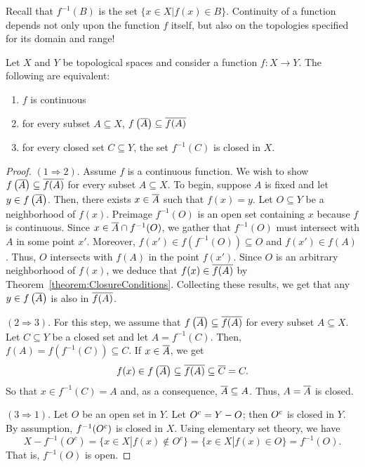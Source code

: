 Recall that $f^{-1}(B)$ is the set $\{ x \in X | f(x) \in B \}$.
Continuity of a function depends not only upon the function $f$ itself, but also on the topologies specified for its domain and range!

\begin{theorem} \label{theorem:ContinuityEquivalentConditions}
Let $X$ and $Y$ be topological spaces and consider a function $f \colon X \rightarrow Y$.
The following are equivalent:
\begin{enumerate}
\item $f$ is continuous
\item for every subset $A \subseteq X$, $f \left( \overline{A} \right) \subseteq \overline{ f(A) }$
\item for every closed set $C \subseteq Y$, the set $f^{-1} (C)$ is closed in $X$.
\end{enumerate}
\end{theorem}
\begin{proof}
$(1 \Rightarrow 2)$.
Assume $f$ is a continuous function.
We wish to show $f \left( \overline{A} \right) \subseteq \overline{ f(A) }$ for every subset $A \subseteq X$.
To begin, suppose $A$ is fixed and let $y \in f \left( \overline{A} \right)$.
Then, there exists $x \in \overline{A}$ such that $f(x) = y$.
Let $O \subseteq Y$ be a neighborhood of $f(x)$.
Preimage $f^{-1}(O)$ is an open set containing $x$ because $f$ is continuous.
Since $x \in \overline{A} \cap f^{-1}(O)$, we gather that $f^{-1}(O)$ must intersect with $A$ in some point $x'$.
Moreover, $f(x') \in f \left( f^{-1}(O) \right) \subseteq O$ and $f(x') \in f(A)$.
Thus, $O$ intersects with $f(A)$ in the point $f(x')$.
Since $O$ is an arbitrary neighborhood of $f(x)$, we deduce that $f(x) \in \overline{ f(A) }$ by Theorem~\ref{theorem:ClosureConditions}.
Collecting these results, we get that any $y \in f \left( \overline{A} \right)$ is also in $\overline{ f(A) }$.

$(2 \Rightarrow 3)$.
For this step, we assume that $f \left( \overline{A} \right) \subseteq \overline{ f(A) }$ for every subset $A \subseteq X$.
Let $C \subseteq Y$ be a closed set and let $A = f^{-1} (C)$.
Then, $f(A) = f \left( f^{-1}(C) \right) \subseteq C$.
If $x \in \overline{A}$, we get
\begin{equation*}
f(x) \in f \left( \overline{A} \right) \subseteq \overline{f (A)} \subseteq \overline{C} = C.
\end{equation*}
So that $x \in f^{-1} (C) = A$ and, as a consequence, $\overline{A} \subseteq A$.
Thus, $A = \overline{A}$ is closed.

$(3 \Rightarrow 1)$.
Let $O$ be an open set in $Y$.
Let ${O}^{c} = Y - O$; then ${O}^{c}$ is closed in $Y$.
By assumption, $f^{-1} ({O}^{c})$ is closed in $X$.
Using elementary set theory, we have
\begin{equation*}
X - f^{-1}(O^c) = \{ x\in X | f(x) \notin O^c \} = \{ x \in X | f(x) \in O \} = f^{-1} (O).
\end{equation*}
That is, $f^{-1} (O)$ is open.
\end{proof}


